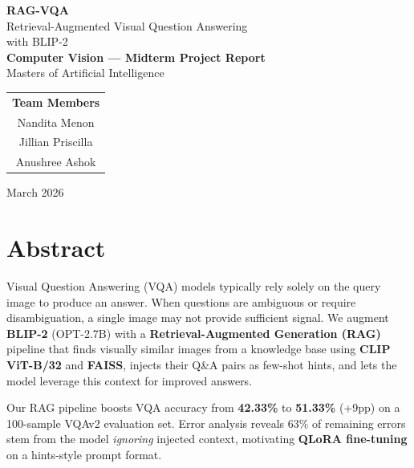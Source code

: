 \documentclass[12pt, a4paper]{article}
\begin{document}
\begin{titlepage}
    \centering
    \vspace*{1.5cm}
    {\Huge\bfseries RAG-VQA}\\[0.5cm]
    {\LARGE Retrieval-Augmented Visual Question Answering\\with BLIP-2}\\[2cm]
    {\Large\bfseries Computer Vision --- Midterm Project Report}\\[0.5cm]
    {\large Masters of Artificial Intelligence}\\[2.5cm]
    \begin{tabular}{c}
        \large\bfseries Team Members \\[0.3cm]
        \large Nandita Menon \\
        \large Jillian Priscilla \\
        \large Anushree Ashok \\
    \end{tabular}
    \vfill
    {\large March 2026}
\end{titlepage}

\tableofcontents
\newpage

\section{Abstract}

Visual Question Answering (VQA) models typically rely solely on the query image to produce an answer. When questions are ambiguous or require disambiguation, a single image may not provide sufficient signal. We augment \textbf{BLIP-2} (OPT-2.7B) with a \textbf{Retrieval-Augmented Generation (RAG)} pipeline that finds visually similar images from a knowledge base using \textbf{CLIP ViT-B/32} and \textbf{FAISS}, injects their Q\&A pairs as few-shot hints, and lets the model leverage this context for improved answers.

Our RAG pipeline boosts VQA accuracy from \textbf{42.33\%} to \textbf{51.33\%} (+9pp) on a 100-sample VQAv2 evaluation set. Error analysis reveals 63\% of remaining errors stem from the model \emph{ignoring} injected context, motivating \textbf{QLoRA fine-tuning} on a hints-style prompt format.

\end{document}
